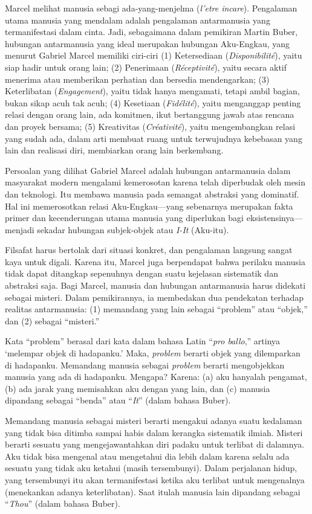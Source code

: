 \documentclass[11pt,twoside,a5paper,openany]{memoir}
\begin{document}
Marcel melihat manusia sebagi ada-yang-menjelma (\emph{l'etre incare}).
Pengalaman utama manusia yang mendalam adalah pengalaman antarmanusia
yang termanifestasi dalam cinta. Jadi, sebagaimana dalam pemikiran
Martin Buber, hubungan antarmanusia yang ideal merupakan hubungan
Aku-Engkau, yang menurut Gabriel Marcel memiliki ciri-ciri (1)
Ketersediaan (\emph{Disponibilité}), yaitu siap hadir untuk orang lain;
(2) Penerimaan (\emph{Réceptivité}), yaitu secara aktif menerima atau
memberikan perhatian dan bersedia mendengarkan; (3) Keterlibatan
(\emph{Engagement}), yaitu tidak hanya mengamati, tetapi ambil bagian,
bukan sikap acuh tak acuh; (4) Kesetiaan (\emph{Fidélité}), yaitu
menganggap penting relasi dengan orang lain, ada komitmen, ikut
bertanggung jawab atas rencana dan proyek bersama; (5) Kreativitas
(\emph{Créativité}), yaitu mengembangkan relasi yang sudah ada, dalam
arti membuat ruang untuk terwujudnya kebebasan yang lain dan realisasi
diri, membiarkan orang lain berkembang.

Persoalan yang dilihat Gabriel Marcel adalah hubungan antarmanusia dalam
masyarakat modern mengalami kemerosotan karena telah diperbudak oleh
mesin dan teknologi. Itu membawa manusia pada semangat abstraksi yang
dominatif. Hal ini memerosotkan relasi Aku-Engkau---yang sebenarnya
merupakan fakta primer dan kecenderungan utama manusia yang diperlukan
bagi eksistensinya---menjadi sekadar hubungan subjek-objek atau
\emph{I-It} (Aku-itu).

Filsafat harus bertolak dari situasi konkret, dan pengalaman langsung
sangat kaya untuk digali. Karena itu, Marcel juga berpendapat bahwa
perilaku manusia tidak dapat ditangkap sepenuhnya dengan suatu kejelasan
sistematik dan abstraksi saja. Bagi Marcel, manusia dan hubungan
antarmanusia harus didekati sebagai misteri. Dalam pemikirannya, ia
membedakan dua pendekatan terhadap realitas antarmanusia: (1) memandang
yang lain sebagai ``problem'' atau ``objek,'' dan (2) sebagai
``misteri.''

Kata ``problem'' berasal dari kata dalam bahasa Latin ``\emph{pro
ballo},'' artinya `melempar objek di hadapanku.' Maka, \emph{problem}
berarti objek yang dilemparkan di hadapanku. Memandang manusia sebagai
\emph{problem} berarti mengobjekkan manusia yang ada di hadapanku.
Mengapa? Karena: (a) aku hanyalah pengamat, (b) ada jarak yang
memisahkan aku dengan yang lain, dan (c) manusia dipandang sebagai
``benda'' atau ``\emph{It}'' (dalam bahasa Buber).

Memandang manusia sebagai misteri berarti mengakui adanya suatu
kedalaman yang tidak bisa ditimba sampai habis dalam kerangka sistematik
ilmiah. Misteri berarti sesuatu yang mengejawantahkan diri padaku untuk
terlibat di dalamnya. Aku tidak bisa mengenal atau mengetahui dia lebih
dalam karena selalu ada sesuatu yang tidak aku ketahui (masih
tersembunyi). Dalam perjalanan hidup, yang tersembunyi itu akan
termanifestasi ketika aku terlibat untuk mengenalnya (menekankan adanya
keterlibatan). Saat itulah manusia lain dipandang sebagai
``\emph{Thou}'' (dalam bahasa Buber).
\end{document}
